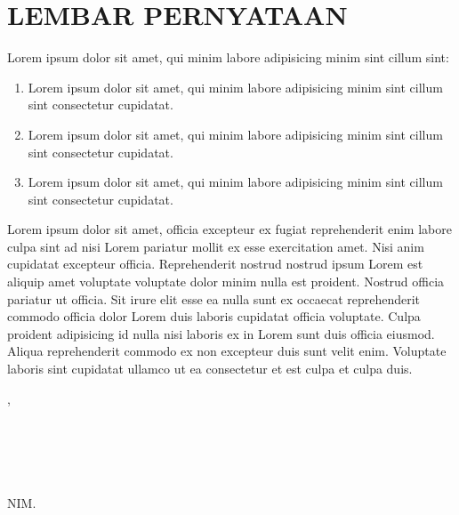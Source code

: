 \makeatletter
\def\statement{%
	\chapter*{LEMBAR PERNYATAAN}%
}
\makeatother

\statement

Lorem ipsum dolor sit amet, qui minim labore adipisicing minim sint cillum sint:

\begin{enumerate}
	\item Lorem ipsum dolor sit amet, qui minim labore adipisicing minim sint cillum sint consectetur cupidatat.
	\item Lorem ipsum dolor sit amet, qui minim labore adipisicing minim sint cillum sint consectetur cupidatat.
	\item Lorem ipsum dolor sit amet, qui minim labore adipisicing minim sint cillum sint consectetur cupidatat.
\end{enumerate}

Lorem ipsum dolor sit amet, officia excepteur ex fugiat reprehenderit enim labore culpa sint ad nisi Lorem pariatur mollit ex esse exercitation amet. Nisi anim cupidatat excepteur officia. Reprehenderit nostrud nostrud ipsum Lorem est aliquip amet voluptate voluptate dolor minim nulla est proident. Nostrud officia pariatur ut officia. Sit irure elit esse ea nulla sunt ex occaecat reprehenderit commodo officia dolor Lorem duis laboris cupidatat officia voluptate. Culpa proident adipisicing id nulla nisi laboris ex in Lorem sunt duis officia eiusmod. Aliqua reprehenderit commodo ex non excepteur duis sunt velit enim. Voluptate laboris sint cupidatat ullamco ut ea consectetur et est culpa et culpa duis.
\vspace{15mm}

\hspace*{\fill}\makeatletter\@city, \@examdate\makeatother\\
\\
\\
\\
\\
\hspace*{\fill}\makeatletter\@fullname\makeatother\\
\hspace*{\fill}NIM. \makeatletter\@nim\makeatother
